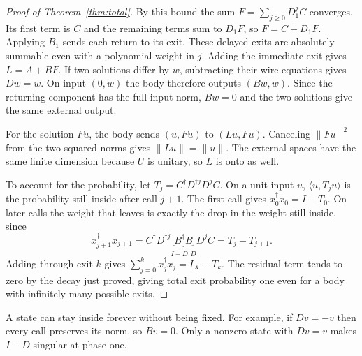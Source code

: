 \documentclass[acmsmall,screen,review,anonymous,nonacm]{acmart}
\numberwithin{equation}{section}
\begin{document}
\begin{proof}[Proof of Theorem~\ref{thm:total}]
By this bound the sum $F=\sum_{j\ge0}D_1^jC$ converges. Its first
term is $C$ and the remaining terms sum to $D_1F$, so $F=C+D_1F$.
Applying $B_1$ sends each return to its exit. These delayed exits
are absolutely summable even with a polynomial weight in $j$.
Adding the immediate exit gives $L=A+BF$. If two solutions differ by $w$, subtracting their wire equations gives
$Dw=w$. On input $(0,w)$ the body therefore outputs $(Bw,w)$. Since
the returning component has the full input norm, $Bw=0$ and the two
solutions give the same external output.

For the solution $Fu$, the body sends $(u,Fu)$ to $(Lu,Fu)$.
Canceling $\|Fu\|^2$ from the two squared norms gives
$\|Lu\|=\|u\|$. The external spaces have the same finite dimension
because $U$ is unitary, so $L$ is onto as well.

To account for the probability, let $T_j=C^\dagger D^{\dagger
j}D^jC$. On a unit input $u$, $\langle u,T_ju\rangle$ is the
probability still inside after call $j+1$. The first call gives $x_0^\dagger x_0=I-T_0$. On later calls the weight that leaves
is exactly the drop in the weight still inside, since
\[
x_{j+1}^\dagger x_{j+1} = C^\dagger D^{\dagger
j}\underbrace{B^\dagger B}_{I-D^\dagger D}D^j C = T_j-T_{j+1}.
\]
Adding through exit $k$ gives $\sum_{j=0}^k x_j^\dagger x_j=I_X-T_k$.
The residual term tends to zero by the decay just proved, giving
total exit probability one even for a body with infinitely many
possible exits.
\end{proof}

A state can stay inside forever without being fixed. For example, if
$Dv=-v$ then every call preserves its norm, so $Bv=0$. Only a nonzero state
with $Dv=v$ makes $I-D$ singular at phase one.
\end{document}
